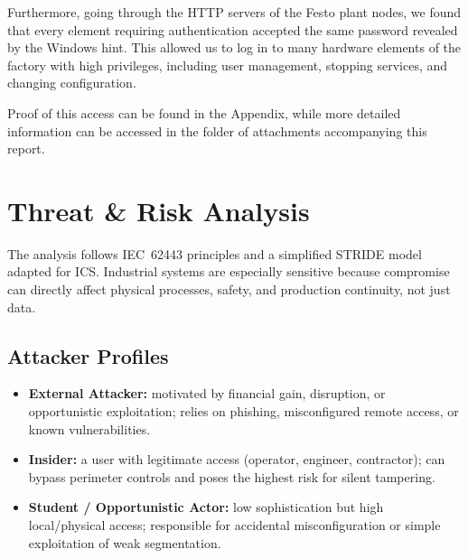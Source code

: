 \documentclass[11pt,a4paper]{article}
\begin{document}
Furthermore, going through the HTTP servers of the Festo plant
nodes, we found that every element requiring authentication
accepted the same password revealed by the Windows hint. This
allowed us to log in to many hardware elements of the factory
with high privileges, including user management, stopping
services, and changing configuration. 

Proof of this access can be found in the Appendix, while more detailed information can be accessed in the folder of attachments accompanying this report.

\pagebreak
\section{Threat \& Risk Analysis}
The analysis follows IEC~62443 principles and a simplified STRIDE model adapted
for ICS. Industrial systems are especially sensitive because compromise can directly
affect physical processes, safety, and production continuity, not just data.

\subsection{Attacker Profiles}
\begin{itemize}[nosep]
  \item \textbf{External Attacker:} motivated by financial gain, disruption, or opportunistic exploitation; relies on phishing, misconfigured remote access, or known vulnerabilities.
  \item \textbf{Insider:} a user with legitimate access (operator, engineer, contractor); can bypass perimeter controls and poses the highest risk for silent tampering.
  \item \textbf{Student / Opportunistic Actor:} low sophistication but high local/physical access; responsible for accidental misconfiguration or simple exploitation of weak segmentation.
\end{itemize}
\end{document}
